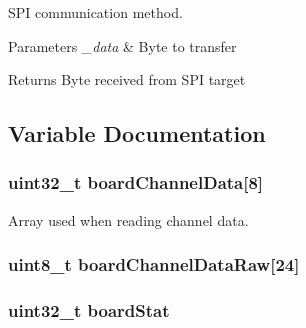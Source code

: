 S\+P\+I communication method. 


\begin{DoxyParams}{Parameters}
{\em \+\_\+data} & Byte to transfer \\
\hline
\end{DoxyParams}
\begin{DoxyReturn}{Returns}
Byte received from S\+P\+I target 
\end{DoxyReturn}


\subsection{Variable Documentation}
\hypertarget{group___a_d_s1299___library_gad8303f3f7907884aa1ef5727220fd293}{}
\subsubsection[{board\+Channel\+Data}]{\setlength{\rightskip}{0pt plus 5cm}uint32\+\_\+t board\+Channel\+Data\mbox{[}8\mbox{]}}\label{group___a_d_s1299___library_gad8303f3f7907884aa1ef5727220fd293}


Array used when reading channel data. 

\hypertarget{group___a_d_s1299___library_gaa891a075c92bada339ffdb3a6f8c5ac8}{}
\subsubsection[{board\+Channel\+Data\+Raw}]{\setlength{\rightskip}{0pt plus 5cm}uint8\+\_\+t board\+Channel\+Data\+Raw\mbox{[}24\mbox{]}}\label{group___a_d_s1299___library_gaa891a075c92bada339ffdb3a6f8c5ac8}
\hypertarget{group___a_d_s1299___library_ga50edda929d7766e162d89ec32181a93a}{}
\subsubsection[{board\+Stat}]{\setlength{\rightskip}{0pt plus 5cm}uint32\+\_\+t board\+Stat}\label{group___a_d_s1299___library_ga50edda929d7766e162d89ec32181a93a}


